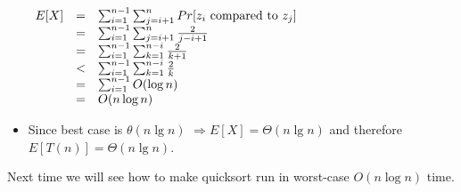 \documentclass[11pt]{article}
\begin{document}
\begin{itemize}
  $\begin{array}{lcl}
  E[X] &=& \sum_{i=1}^{n-1}\sum_{j=i+1}^{n} Pr[z_i ~{\rm compared}~{\rm
             to}~ z_j] \\
       &=& \sum_{i=1}^{n-1}\sum_{j=i+1}^{n} \frac{2}{j-i+1} \\
       &=& \sum_{i=1}^{n-1}\sum_{k=1}^{n-i} \frac{2}{k+1} \\
       &<& \sum_{i=1}^{n-1}\sum_{k=1}^{n-i} \frac{2}{k} \\
       &=& \sum_{i=1}^{n-1} O(\log n) \\
       &=& O(n\log n)
  \end{array}$  

\item Since best case is $\theta(n \lg n)$ $\Longrightarrow  E[X] =
\Theta(n \lg n)$ and therefore $E[T(n)] = \Theta(n \lg n)$. 

\end{itemize}



\vspace{\baselineskip}

 Next time we will see how to make quicksort run in worst-case
$O(n\log n)$ time.
\end{document}
